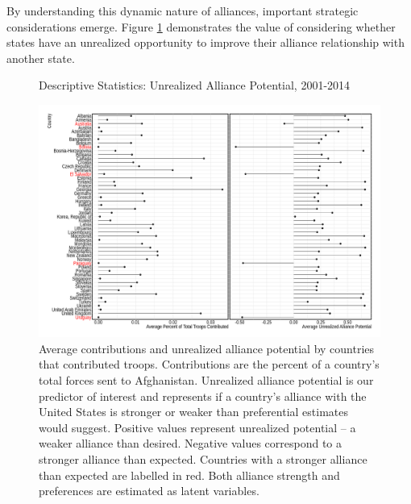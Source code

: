 \documentclass[12pt,letterpaper]{article}
\begin{document}
		
		By understanding this dynamic nature of alliances, important strategic considerations emerge. Figure \ref{fig:measure_comparison_alliances} demonstrates the value of considering whether states have an unrealized opportunity to improve their alliance relationship with another state.

		\newpage
		\begin{figure}[H]
			\begin{center}
				Descriptive Statistics: Unrealized Alliance Potential, 2001-2014
			\end{center}
			\vspace{-1em}
			\hspace{-5em}\includegraphics[width = 1.25\textwidth]{figures/descriptive_stats.png}
			\caption{Average contributions and unrealized alliance potential by countries that contributed troops. Contributions are the percent of a country's total forces sent to Afghanistan. Unrealized alliance potential is our predictor of interest and represents if a country's alliance with the United States is stronger or weaker than preferential estimates would suggest. Positive values represent unrealized potential -- a weaker alliance than desired. Negative values correspond to a stronger alliance than expected. Countries with a stronger alliance than expected are labelled in red. Both alliance strength and preferences are estimated as latent variables.}
			\label{fig:measure_comparison_alliances}
		\end{figure}
		\newpage
		
\end{document}
